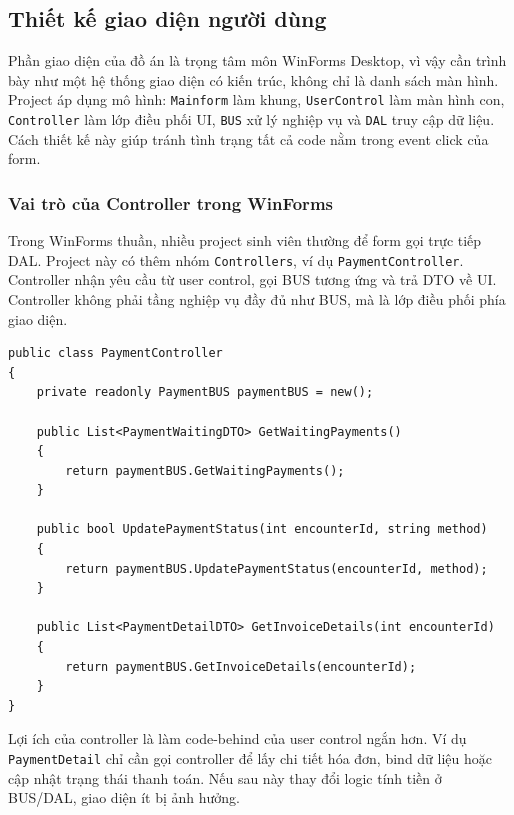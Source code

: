 \documentclass[12pt,a4paper]{article}
\numberwithin{figure}{subsection}
\numberwithin{table}{subsection}
\newcounter{codecounter}
\newenvironment{codeblock}[2]{%
    \refstepcounter{codecounter}%
    \phantomsection%
    \label{#1}%
    \par\smallskip
}{%
    \par\smallskip
}
\begin{document}
\subsection{Thiết kế giao diện người dùng}

Phần giao diện của đồ án là trọng tâm môn WinForms Desktop, vì vậy cần trình bày như một hệ thống giao diện có kiến trúc, không chỉ là danh sách màn hình. Project áp dụng mô hình: \texttt{Mainform} làm khung, \texttt{UserControl} làm màn hình con, \texttt{Controller} làm lớp điều phối UI, \texttt{BUS} xử lý nghiệp vụ và \texttt{DAL} truy cập dữ liệu. Cách thiết kế này giúp tránh tình trạng tất cả code nằm trong event click của form.

\subsubsection{Vai trò của Controller trong WinForms}

Trong WinForms thuần, nhiều project sinh viên thường để form gọi trực tiếp DAL. Project này có thêm nhóm \texttt{Controllers}, ví dụ \texttt{PaymentController}. Controller nhận yêu cầu từ user control, gọi BUS tương ứng và trả DTO về UI. Controller không phải tầng nghiệp vụ đầy đủ như BUS, mà là lớp điều phối phía giao diện.

\begin{codeblock}{code:payment-controller-detail}{PaymentController điều phối UI và BUS}
\begin{verbatim}
public class PaymentController
{
    private readonly PaymentBUS paymentBUS = new();

    public List<PaymentWaitingDTO> GetWaitingPayments()
    {
        return paymentBUS.GetWaitingPayments();
    }

    public bool UpdatePaymentStatus(int encounterId, string method)
    {
        return paymentBUS.UpdatePaymentStatus(encounterId, method);
    }

    public List<PaymentDetailDTO> GetInvoiceDetails(int encounterId)
    {
        return paymentBUS.GetInvoiceDetails(encounterId);
    }
}
\end{verbatim}
\end{codeblock}

Lợi ích của controller là làm code-behind của user control ngắn hơn. Ví dụ \texttt{PaymentDetail} chỉ cần gọi controller để lấy chi tiết hóa đơn, bind dữ liệu hoặc cập nhật trạng thái thanh toán. Nếu sau này thay đổi logic tính tiền ở BUS/DAL, giao diện ít bị ảnh hưởng.
\end{document}

